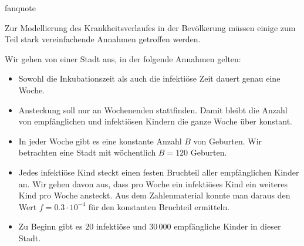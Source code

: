 \documentclass[%
<<<<<<< Updated upstream
<<<<<<< Updated upstream
11pt,%
twoside,%
titlepage,%
german,%
headsepline%
]{scrartcl}
\begin{document}
\begin{uebenv}{fanquote}
\begin{center}
\end{center}

Zur Modellierung des Krankheitsverlaufes in der Bevölkerung müssen einige zum Teil stark vereinfachende Annahmen getroffen werden.

Wir gehen von einer Stadt aus, in der folgende Annahmen gelten:

\begin{itemize}
\item Sowohl die Inkubationszeit als auch die infektiöse Zeit dauert genau eine Woche.
\item Ansteckung soll nur an Wochenenden stattfinden. Damit bleibt die Anzahl von empfänglichen und infektiösen Kindern die ganze Woche über konstant.
\item In jeder Woche gibt es eine konstante Anzahl $B$ von Geburten. Wir betrachten eine Stadt mit wöchentlich $B=120$ Geburten.
\item Jedes infektiöse Kind steckt einen festen Bruchteil aller empfänglichen Kinder an. Wir gehen davon aus, dass pro Woche ein infektiöses Kind ein weiteres Kind pro Woche ansteckt. Aus dem Zahlenmaterial konnte man daraus den Wert $f=0.3\cdot10^{-4}$ für den konstanten Bruchteil ermitteln.
\item Zu Beginn gibt es $20$ infektiöse und $30\,000$ empfängliche Kinder in dieser
Stadt.
\end{itemize}


\end{uebenv}
\end{document}
